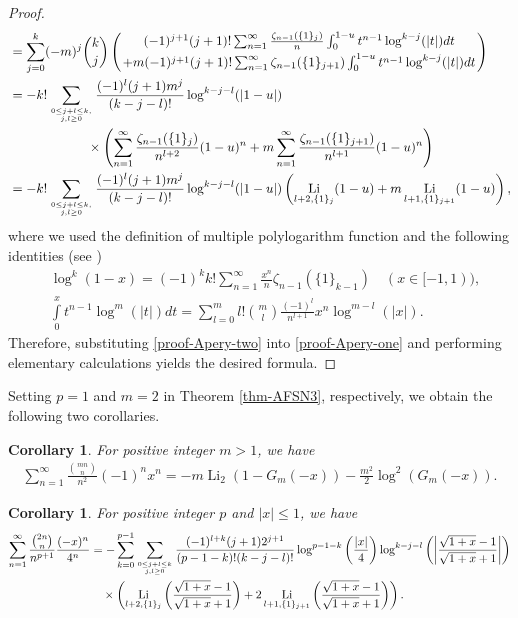 \documentclass[11pt]{article}
\DeclareMathOperator{\Li}{Li}
\theoremstyle{plain}
\newtheorem{cor}[thm]{Corollary}
\theoremstyle{definition}
\begin{document}
\begin{proof}
\begin{align}
&=\sum_{j=0}^k (-m)^j\binom{k}{j} \left((-1)^{j+1}(j+1)!\sum_{n=1}^\infty \frac{\zeta_{n-1}(\{1\}_{j})}{n} \int_0^{1-u} t^{n-1} \log^{k-j}(|t|)dt\atop +m(-1)^{j+1}(j+1)!\sum_{n=1}^\infty \zeta_{n-1}(\{1\}_{j+1})\int_0^{1-u} t^{n-1} \log^{k-j}(|t|)dt\right)\nonumber\\
&=-k!\sum_{0\leq j+l\leq k,\atop j,l\geq 0} \frac{(-1)^l(j+1)m^j}{(k-j-l)!}\log^{k-j-l}(|1-u|)\nonumber\\
&\qquad\qquad\qquad\times\left(\sum_{n=1}^\infty \frac{\zeta_{n-1}(\{1\}_j)}{n^{l+2}}(1-u)^n+m \sum_{n=1}^\infty \frac{\zeta_{n-1}(\{1\}_{j+1})}{n^{l+1}}(1-u)^n \right)\nonumber\\
&=-k!\sum_{0\leq j+l\leq k,\atop j,l\geq 0} \frac{(-1)^l(j+1)m^j}{(k-j-l)!}\log^{k-j-l}(|1-u|)\left(\Li_{l+2,\{1\}_j}(1-u)+m\Li_{l+1,\{1\}_{j+1}}(1-u)\right),
\end{align}
where we used the definition of multiple polylogarithm function and the following identities (see \cite{Xu17.MZVES})
\begin{align*}
&\log ^k(1 - x) = (- 1)^kk!\sum\limits_{n = 1}^\infty  \frac{{{x^n}}}{n}{\zeta _{n - 1}}(\{1\}_{k - 1})\quad (x\in[-1,1)),\\
&\int\limits_0^x t^{n-1}\log^m(|t|) dt = \sum\limits_{l = 0}^m {l!\binom{m}{l}\frac{{\left( { - 1} \right)}^l}{n^{l + 1}}x^{n}\log^{m - l} (|x|)} .
\end{align*}
Therefore, substituting \eqref{proof-Apery-two} into \eqref{proof-Apery-one} and performing elementary calculations yields the desired formula.
\end{proof}

Setting $p=1$ and $m=2$ in Theorem \ref{thm-AFSN3}, respectively, we obtain the following two corollaries.
\begin{cor}\label{cor-cthm-ases-p-1} For positive integer $m>1$, we have
\begin{align}\label{equ-cor-sec4-one}
\sum_{n=1}^\infty \frac{\binom{mn}{n}}{n^2}(-1)^nx^n=-m\Li_2(1-G_m(-x))-\frac{m^2}{2}\log^2(G_m(-x)).
\end{align}
\end{cor}

\begin{cor} For positive integer $p$ and $|x|\leq 1$, we have
\begin{align}\label{equ-cor-anotherexa}
\sum_{n=1}^\infty \frac{\binom{2n}{n}}{n^{p+1}}\frac{(-x)^n}{4^n}&=-\sum_{k=0}^{p-1} \sum_{0\leq j+l\leq k\atop j,l\geq 0} \frac{(-1)^{l+k}(j+1)2^{j+1}}{(p-1-k)!(k-j-l)!}\log^{p-1-k}\left(\frac{|x|}{4}\right)\log^{k-j-l}\left(\left\vert\frac{\sqrt{1+x}-1}{\sqrt{1+x}+1}\right\vert\right)\nonumber\\
&\quad\times\left(\Li_{l+2,\{1\}_j}\left(\frac{\sqrt{1+x}-1}{\sqrt{1+x}+1}\right)+2\Li_{l+1,\{1\}_{j+1}}\left(\frac{\sqrt{1+x}-1}{\sqrt{1+x}+1}\right)\right).
\end{align}
\end{cor}
\end{document}
